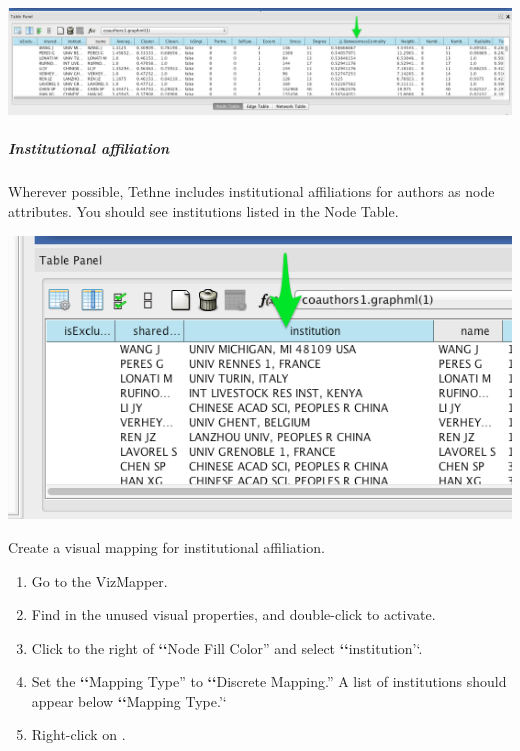 \documentclass[letterpaper,10pt,english]{sphinxmanual}
\begin{document}
{\hfill\includegraphics{coauthors.15.png}\hfill}


\subparagraph{Institutional affiliation}
\label{tutorial.coauthors:institutional-affiliation}
Wherever possible, Tethne includes institutional affiliations for authors as node
attributes. You should see institutions listed in the Node Table.

{\hfill\includegraphics{coauthors.16.png}\hfill}

Create a visual mapping for institutional affiliation.
\begin{enumerate}
\item {} 
Go to the VizMapper.

\item {} 
Find  in the unused visual properties, and double-click to activate.

\item {} 
Click to the right of {\color{red}\bfseries{}{}`{}`}Node Fill Color'' and select {\color{red}\bfseries{}{}`{}`}institution'`.

\item {} 
Set the {\color{red}\bfseries{}{}`{}`}Mapping Type'' to {\color{red}\bfseries{}{}`{}`}Discrete Mapping.'' A list of institutions should appear
below {\color{red}\bfseries{}{}`{}`}Mapping Type.'`

\item {} 
Right-click on .

\end{enumerate}
\end{document}
